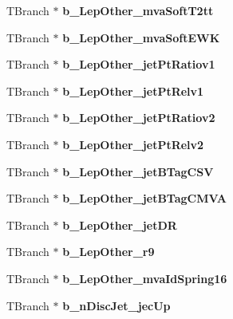 \begin{DoxyCompactItemize}
T\+Branch $\ast$ {\bfseries b\+\_\+\+Lep\+Other\+\_\+mva\+Soft\+T2tt}
\item 
\hypertarget{classMiniTree_aa6ae396215bcaf22caea6f5e1e37f41f}{}\label{classMiniTree_aa6ae396215bcaf22caea6f5e1e37f41f} 
T\+Branch $\ast$ {\bfseries b\+\_\+\+Lep\+Other\+\_\+mva\+Soft\+E\+WK}
\item 
\hypertarget{classMiniTree_ae7978a222f5f56dee89c6eaed957ad34}{}\label{classMiniTree_ae7978a222f5f56dee89c6eaed957ad34} 
T\+Branch $\ast$ {\bfseries b\+\_\+\+Lep\+Other\+\_\+jet\+Pt\+Ratiov1}
\item 
\hypertarget{classMiniTree_a0fce4b660ef415e422309cef7b15ff93}{}\label{classMiniTree_a0fce4b660ef415e422309cef7b15ff93} 
T\+Branch $\ast$ {\bfseries b\+\_\+\+Lep\+Other\+\_\+jet\+Pt\+Relv1}
\item 
\hypertarget{classMiniTree_afd5e88bcf868b7d4e74eead01d22f27d}{}\label{classMiniTree_afd5e88bcf868b7d4e74eead01d22f27d} 
T\+Branch $\ast$ {\bfseries b\+\_\+\+Lep\+Other\+\_\+jet\+Pt\+Ratiov2}
\item 
\hypertarget{classMiniTree_a1b8f0343bc70f64029fc78c9443387ba}{}\label{classMiniTree_a1b8f0343bc70f64029fc78c9443387ba} 
T\+Branch $\ast$ {\bfseries b\+\_\+\+Lep\+Other\+\_\+jet\+Pt\+Relv2}
\item 
\hypertarget{classMiniTree_a66757cc20681e21e7b7b9931e3f4cf90}{}\label{classMiniTree_a66757cc20681e21e7b7b9931e3f4cf90} 
T\+Branch $\ast$ {\bfseries b\+\_\+\+Lep\+Other\+\_\+jet\+B\+Tag\+C\+SV}
\item 
\hypertarget{classMiniTree_aa76221d662f28f63b95eebf37a44370b}{}\label{classMiniTree_aa76221d662f28f63b95eebf37a44370b} 
T\+Branch $\ast$ {\bfseries b\+\_\+\+Lep\+Other\+\_\+jet\+B\+Tag\+C\+M\+VA}
\item 
\hypertarget{classMiniTree_a54480c7a3d2cbbe379d7368edc3d2876}{}\label{classMiniTree_a54480c7a3d2cbbe379d7368edc3d2876} 
T\+Branch $\ast$ {\bfseries b\+\_\+\+Lep\+Other\+\_\+jet\+DR}
\item 
\hypertarget{classMiniTree_ae843cc97d6b5c19e7f88771be4403e7a}{}\label{classMiniTree_ae843cc97d6b5c19e7f88771be4403e7a} 
T\+Branch $\ast$ {\bfseries b\+\_\+\+Lep\+Other\+\_\+r9}
\item 
\hypertarget{classMiniTree_a706a2cd645bda70f07f8a458361ad92a}{}\label{classMiniTree_a706a2cd645bda70f07f8a458361ad92a} 
T\+Branch $\ast$ {\bfseries b\+\_\+\+Lep\+Other\+\_\+mva\+Id\+Spring16}
\item 
\hypertarget{classMiniTree_a775d6f9c8594fed7593e53695327380b}{}\label{classMiniTree_a775d6f9c8594fed7593e53695327380b} 
T\+Branch $\ast$ {\bfseries b\+\_\+n\+Disc\+Jet\+\_\+jec\+Up}

\end{DoxyCompactItemize}
